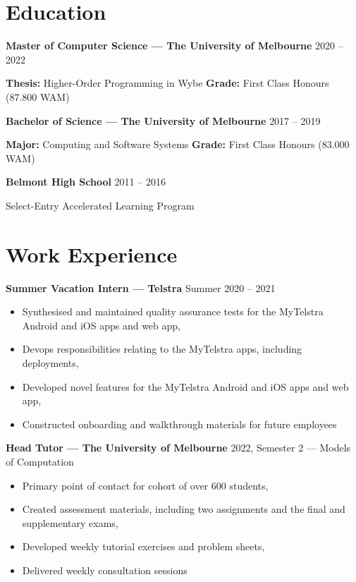 \documentclass[9pt]{extarticle}
\newcommand{\entry}[3]{
    \textbf{#1} \newline
    {\footnotesize #2}
    \vspace{.05em}
    \begin{flushleft}
        #3
    \end{flushleft}
}
\begin{document}
\begin{minipage}[t]{.65\textwidth}
\vspace*{0pt}

\section{Education}

\entry{Master of Computer Science --- The University of Melbourne}
{2020 -- 2022}
{
    \textbf{Thesis:} Higher-Order Programming in Wybe \newline
    \textbf{Grade:} First Class Honours (87.800 WAM) \newline
}

\entry{Bachelor of Science --- The University of Melbourne}
{2017 -- 2019}
{
    \textbf{Major:} Computing and Software Systems \newline
    \textbf{Grade:} First Class Honours (83.000 WAM) \newline
}

\entry{Belmont High School}
{2011 -- 2016}
{Select-Entry Accelerated Learning Program}

\medskip

\section{Work Experience}

\entry{Summer Vacation Intern --- Telstra}
{Summer 2020 -- 2021}
{
    \begin{itemize}
        \item Synthesised and maintained quality assurance tests for the MyTelstra Android and iOS apps and web app,
        \item Devops responsibilities relating to the MyTelstra apps, including deployments,
        \item Developed novel features for the MyTelstra Android and iOS apps and web app,
        \item Constructed onboarding and walkthrough materials for future employees
    \end{itemize}
}
\vspace{1.5em}

\entry{Head Tutor --- The University of Melbourne}
{
    2022, Semester 2 --- Models of Computation
}
{
    \begin{itemize}
        \item Primary point of contact for cohort of over 600 students,
        \item Created assessment materials, including two assignments and the final and supplementary exams,
        \item Developed weekly tutorial exercises and problem sheets,
        \item Delivered weekly consultation sessions
    \end{itemize}
}
\vspace{1.5em}


\end{minipage}
\end{document}
